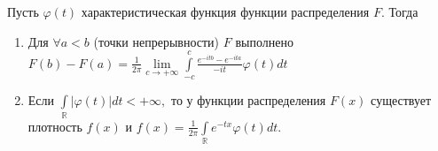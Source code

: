 	\begin{theorem}
		Пусть \(\varphi(t)\) характеристическая функция функции распределения \(F\). Тогда
		\begin{enumerate}
			\item Для \(\forall a < b\) (точки непрерывности) \(F\) выполнено
			\(F(b) - F(a) = \frac{1}{2\pi} \lim\limits_{c \to +\infty} \int\limits_{-c}^{c} \frac{e^{-itb} - e^{-ita}}{-it}\varphi(t)dt\)
			\item Если \(\int\limits_\mathbb{R}|\varphi(t)|dt < +\infty,\) то у функции распределения \(F(x)\) существует плотность \(f(x)\) и \(f(x) = \frac{1}{2\pi}\int\limits_\mathbb{R} e^{-tx}\varphi(t)dt.\)
		\end{enumerate}
	\end{theorem}
	